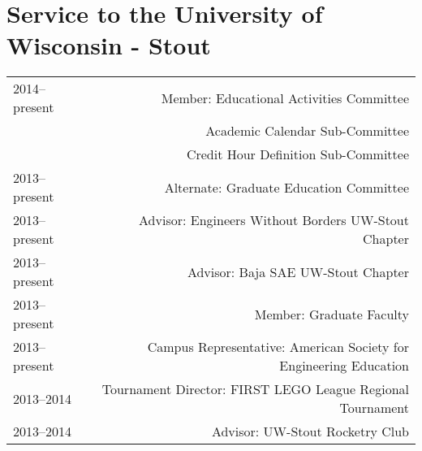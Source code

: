 \section*{Service to the University of Wisconsin - Stout}
\begin{tabular}{L!{\VRule}R}
2014--present&Member: Educational Activities Committee \\
 &Academic Calendar Sub-Committee \\
 &Credit Hour Definition Sub-Committee \\
2013--present&Alternate: Graduate Education Committee \\
2013--present&Advisor: Engineers Without Borders UW-Stout Chapter \\
2013--present&Advisor: Baja SAE UW-Stout Chapter \\
2013--present&Member: Graduate Faculty \\
2013--present&Campus Representative: American Society for Engineering Education\\
2013--2014&Tournament Director: FIRST LEGO League Regional Tournament\\
2013--2014&Advisor: UW-Stout Rocketry Club\\
\end{tabular}